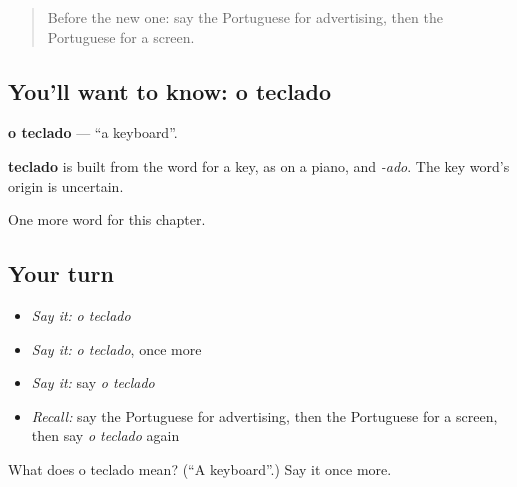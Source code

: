 \label{lesson:PT-C245-teclado}



\begin{quote}
Before the new one: say the Portuguese for advertising, then the Portuguese for a screen.
\end{quote}

\subsection*{You'll want to know: o teclado}
\textbf{o teclado} — \textquotedblleft{}a keyboard\textquotedblright{}.

\begin{cousinweb}
\textbf{teclado} is built from the word for a key, as on a piano, and \emph{-ado}. The key word's origin is uncertain.
\end{cousinweb}

\begin{grammarlens}[title={What you've built}]
One more word for this chapter.
\end{grammarlens}

\subsection*{Your turn}
\begin{itemize}
\raggedright
  \item \emph{Say it:} \emph{o teclado}
  \item \emph{Say it:} \emph{o teclado}, once more
  \item \emph{Say it:} say \emph{o teclado}
  \item \emph{Recall:} say the Portuguese for advertising, then the Portuguese for a screen, then say \emph{o teclado} again
\end{itemize}

\begin{tcolorbox}[breakable,colback=teal!4,colframe=teal!35!black,title={Before you move on}]
What does o teclado mean? (\textquotedblleft{}A keyboard\textquotedblright{}.) Say it once more.
\end{tcolorbox}
